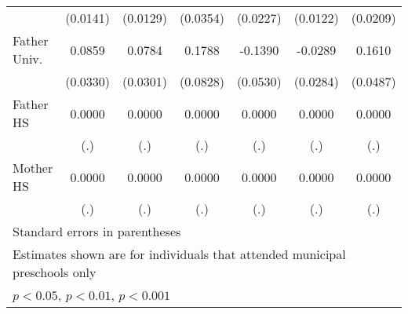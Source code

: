 \begin{table}[htbp]
\begin{tabular}{l*{6}{c}}
            &    (0.0141)         &    (0.0129)         &    (0.0354)         &    (0.0227)         &    (0.0122)         &    (0.0209)         \\
\addlinespace
Father Univ.&      0.0859\sym{**} &      0.0784\sym{**} &      0.1788\sym{*}  &     -0.1390\sym{**} &     -0.0289         &      0.1610\sym{**} \\
            &    (0.0330)         &    (0.0301)         &    (0.0828)         &    (0.0530)         &    (0.0284)         &    (0.0487)         \\
\addlinespace
Father HS   &      0.0000         &      0.0000         &      0.0000         &      0.0000         &      0.0000         &      0.0000         \\
            &         (.)         &         (.)         &         (.)         &         (.)         &         (.)         &         (.)         \\
\addlinespace
Mother HS   &      0.0000         &      0.0000         &      0.0000         &      0.0000         &      0.0000         &      0.0000         \\
            &         (.)         &         (.)         &         (.)         &         (.)         &         (.)         &         (.)         \\
\bottomrule
\multicolumn{7}{l}{\footnotesize Standard errors in parentheses}\\
\multicolumn{7}{l}{\footnotesize Estimates shown are for individuals that attended municipal preschools only}\\
\multicolumn{7}{l}{\footnotesize \sym{*} \(p<0.05\), \sym{**} \(p<0.01\), \sym{***} \(p<0.001\)}\\
\end{tabular}
\end{table}
